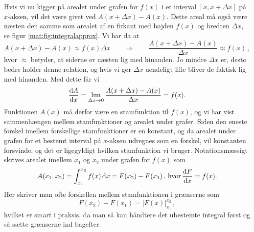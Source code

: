 Hvis vi nu kigger på arealet under grafen for $f(x)$ i et interval $[x,x+\Delta x]$ på $x$-aksen, vil det være givet ved $A(x+\Delta x) - A(x)$. Dette areal må også være næsten den samme som arealet af en firkant med højden $f(x)$ og bredten $\Delta x$, se figur \ref{mat:fig:integralapprox}. Vi har da at 
$$
A(x+\Delta x) - A(x) \approx f(x)\Delta x \qquad \Rightarrow \qquad \frac{A(x+\Delta x) - A(x)}{\Delta x} \approx f(x) \, ,
$$
hvor $\approx$ betyder, at siderne er næsten lig med hinanden. Jo mindre $\Delta x$ er, desto bedre holder denne relation, og hvis vi gør $\Delta x$ uendeligt lille bliver de faktisk lig med hinanden. Med dette får vi
$$
\dv{A}{x}=\lim_{\Delta x\rightarrow 0}\frac{A(x+\Delta x) - A(x)}{\Delta x}=f(x).
$$
Funktionen $A(x)$ må derfor være en stamfunktion til $f(x)$, og vi har vist sammenhængen mellem stamfunktioner og arealet under grafer. Siden den eneste forskel imellem forskellige stamfunktioner er en konstant, og da arealet under grafen for et bestemt interval på $x$-aksen udregnes som en forskel, vil konstanten forsvinde, og det er ligegyldigt hvilken stamfunktion vi bruger.
Notationsmæssigt skrives arealet imellem $x_1$ og $x_2$ under grafen for $f(x)$ som
\begin{equation}
A(x_1,x_2)=\int_{x_1}^{x_2}f(x)\dd{x}=F(x_2)-F(x_1) \, , \, \text{hvor} \, \dv{F}{x}=f(x).
\end{equation}
Her skriver man ofte forskellen mellem stamfunktionen i grænserne som
\begin{equation} \label{eq:klammestamfunktion}
    F(x_2)-F(x_1)=\Big[F(x)\Big]_{x_1}^{x_2} \, ,
\end{equation}
hvilket er smart i praksis, da man så kan håndtere det ubestemte integral først og så sætte grænserne ind bagefter.
